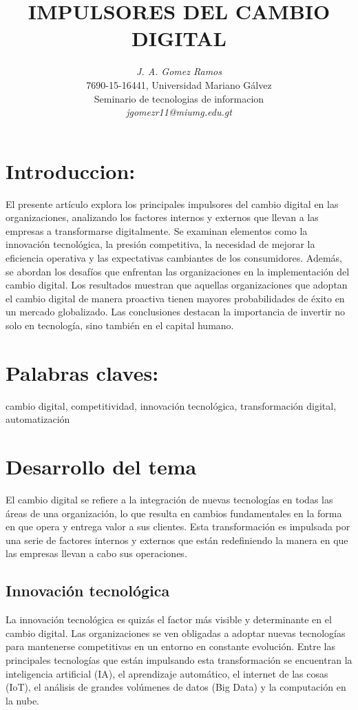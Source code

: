 \documentclass[letterpaper,12pt]{article}
\title{\textbf{IMPULSORES DEL CAMBIO DIGITAL}}
\author{\textit{J. A. Gomez Ramos} \\ 7690-15-16441, Universidad Mariano Gálvez \\ Seminario de tecnologias de informacion \\ \textit{jgomezr11@miumg.edu.gt}}
\date{}
\begin{document}
\maketitle

\section*{Introduccion:}
El presente artículo explora los principales impulsores del cambio digital en las organizaciones, analizando los factores internos y externos que llevan a las empresas a transformarse digitalmente. Se examinan elementos como la innovación tecnológica, la presión competitiva, la necesidad de mejorar la eficiencia operativa y las expectativas cambiantes de los consumidores. Además, se abordan los desafíos que enfrentan las organizaciones en la implementación del cambio digital. Los resultados muestran que aquellas organizaciones que adoptan el cambio digital de manera proactiva tienen mayores probabilidades de éxito en un mercado globalizado. Las conclusiones destacan la importancia de invertir no solo en tecnología, sino también en el capital humano.


\section*{Palabras claves:} cambio digital, competitividad, innovación tecnológica, transformación digital, automatización

\section*{Desarrollo del tema}
El cambio digital se refiere a la integración de nuevas tecnologías en todas las áreas de una organización, lo que resulta en cambios fundamentales en la forma en que opera y entrega valor a sus clientes. Esta transformación es impulsada por una serie de factores internos y externos que están redefiniendo la manera en que las empresas llevan a cabo sus operaciones.

\subsection*{Innovación tecnológica}
La innovación tecnológica es quizás el factor más visible y determinante en el cambio digital. Las organizaciones se ven obligadas a adoptar nuevas tecnologías para mantenerse competitivas en un entorno en constante evolución. Entre las principales tecnologías que están impulsando esta transformación se encuentran la inteligencia artificial (IA), el aprendizaje automático, el internet de las cosas (IoT), el análisis de grandes volúmenes de datos (Big Data) y la computación en la nube.
\end{document}
